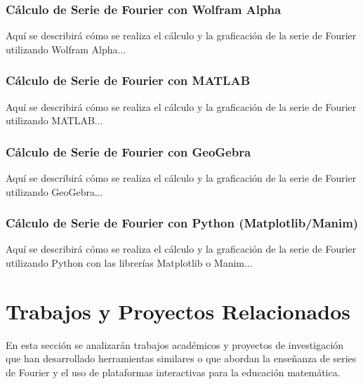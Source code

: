 \subsubsection{Cálculo de Serie de Fourier con Wolfram Alpha}

Aquí se describirá cómo se realiza el cálculo y la graficación de la serie de Fourier utilizando Wolfram Alpha...

\subsubsection{Cálculo de Serie de Fourier con MATLAB}

Aquí se describirá cómo se realiza el cálculo y la graficación de la serie de Fourier utilizando MATLAB...

\subsubsection{Cálculo de Serie de Fourier con GeoGebra}

Aquí se describirá cómo se realiza el cálculo y la graficación de la serie de Fourier utilizando GeoGebra...

\subsubsection{Cálculo de Serie de Fourier con Python (Matplotlib/Manim)}

Aquí se describirá cómo se realiza el cálculo y la graficación de la serie de Fourier utilizando Python con las librerías Matplotlib o Manim...



\section{Trabajos y Proyectos Relacionados}
En esta sección se analizarán trabajos académicos y proyectos de investigación que han desarrollado herramientas similares o que abordan la enseñanza de series de Fourier y el uso de plataformas interactivas para la educación matemática. 

